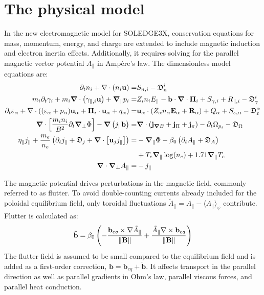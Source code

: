 \chapter{The physical model}
\label{chap:SOLEDGE3X_framework}

\vfill
\begin{chaptersummarybox}
	In the new electromagnetic model for SOLEDGE3X, conservation equations for mass, momentum, energy, and charge are extended to include magnetic induction and electron inertia effects. Additionally, it requires solving for the parallel magnetic vector potential $A_\parallel$ in Ampère's law. The dimensionless model equations are:
	\begin{align*}
		\partial_t n_i + \nabla\cdot\left(n_i\mathbf{u}\right) =& S_{n,i} - \mathfrak{D}_n^i \\
		m_i\partial_t \gamma_{i} + m_i\grad\cdot\left(\gamma_{\parallel,i}\mathbf{u}\right) + \grad_\parallel{p_i} =& Z_in_iE_\parallel - \mathbf{b}\cdot\grad\cdot\boldsymbol{\Pi}_i + S_{\gamma,i} + R_{\parallel,i} - \mathfrak{D}_\gamma^i \\
		\partial_t \varepsilon_\alpha + \nabla \cdot \left( (\varepsilon_\alpha + p_\alpha)\mathbf{u}_\alpha + \boldsymbol{\Pi}_i\cdot\mathbf{u}_\alpha + q_\alpha \right) =& \mathbf{u}_\alpha \cdot \left(Z_\alpha n_\alpha\mathbf{E}_\alpha + \mathbf{R}_\alpha \right) + Q_\alpha + S_{\varepsilon,\alpha} - \mathfrak{D}_\varepsilon^\alpha \\
		\grad\cdot\left[\frac{m_i n_i}{ B^2}\partial_t\grad_\perp\Phi\right] - \grad\left(j_\parallel \textbf{b}\right) =& \grad\cdot\left(\mathbf{j}_{\grad B} + \mathbf{j}_{\Pi} + \mathbf{j}_{\pi}\right) - \partial_t \Omega_{p_i}  - \mathfrak{D}_\Omega \\
		\eta_\parallel j_\parallel + \frac{m_e}{n_e}\left(\partial_t j_\parallel + \mathfrak{D}_j + \grad\cdot\left[\textbf{u}_j j_\parallel \right]\right) =& -\grad_\parallel\Phi - \beta_0 \left(\partial_tA_\parallel + \mathfrak{D}_A\right) \\ 
		&+ T_e\grad_\parallel\log(n_e) + 1.71\grad_\parallel T_e \\
		\grad\cdot\grad_\perp A_\parallel =& -j_\parallel
	\end{align*}
	
	The magnetic potential drives perturbations in the magnetic field, commonly referred to as flutter. To avoid double-counting currents already included for the poloidal equilibrium field, only toroidal fluctuations $\tilde{A}_\parallel = A_\parallel - \langle A_\parallel\rangle_\varphi$ contribute. Flutter is calculated as:
	\begin{equation*}
		\tilde{\mathbf{b}} = \beta_0 \left(- \frac{\mathbf{b}_{eq} \times \nabla \tilde{A}_\parallel}{\norm{\mathbf{B}}} + \frac{\tilde{A}_\parallel \nabla \times \mathbf{b}_{eq}}{\norm{\mathbf{B}}}\right)
	\end{equation*}
	The flutter field is assumed to be small compared to the equilibrium field and is added as a first-order correction, $\textbf{b} = \textbf{b}_{eq} + \tilde{\textbf{b}}$. It affects transport in the parallel direction as well as parallel gradients in Ohm's law, parallel viscous forces, and parallel heat conduction.
\end{chaptersummarybox}
